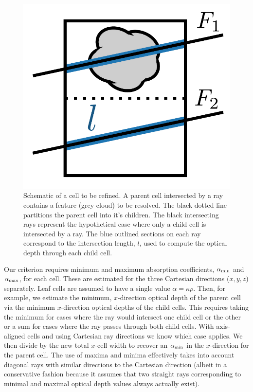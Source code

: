 \documentclass[fleq,usenatbib]{mnras}
\begin{document}
{\begin{figure}
\includegraphics[width=1\linewidth]{Figures/refine.pdf}
\caption{Schematic of a cell to be refined. A parent cell intersected by a ray 
contains a feature (grey cloud) to be resolved. The black dotted line 
partitions the parent cell into it's children. The black intersecting rays 
represent the hypothetical case where only a child cell is intersected by a 
ray. The blue outlined sections on each ray correspond to the intersection 
length, $l$,  used to compute the optical depth through each child cell.}
\label{fig:refine}
\end{figure}
Our criterion requires minimum and maximum 
absorption coefficients, $\alpha_{\rm min}$ and $\alpha_{\rm max}$, for each cell.
These are estimated for the three Cartesian directions ($x,y,z$) separately.
Leaf cells are assumed to have a single value $\alpha = \kappa \rho$.
Then, for example,
we estimate the minimum, $x$-direction optical depth of the parent cell via
the minimum $x$-direction optical depths of the child cells.  This requires
taking the minimum for cases where the ray would intersect
one child cell or the other or a sum for cases where the ray passes
through both child cells.  With axis-aligned cells and using 
Cartesian ray directions we know which case applies. We then divide by
the new total $x$-cell width to recover an $\alpha_{\rm min}$ in the $x$-direction for the
parent cell.  The use of maxima and minima effectively takes into account diagonal
rays with similar directions to the Cartesian direction 
(albeit in a conservative fashion because it assumes that two straight rays
corresponding to minimal and maximal optical depth values always actually
exist).  

}
\end{document}
